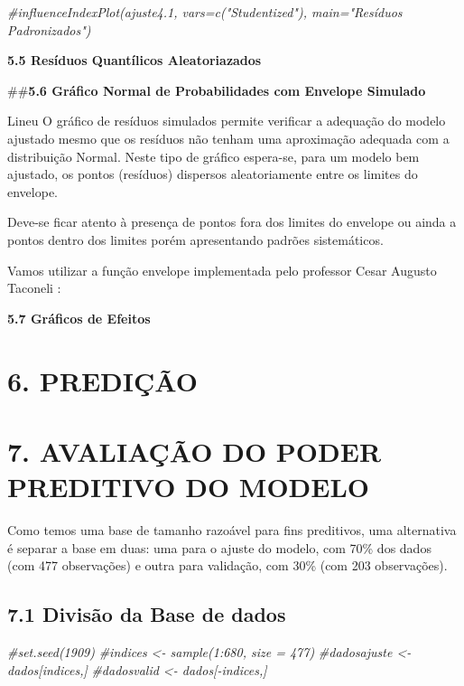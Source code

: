\documentclass[]{article}
\newenvironment{Shaded}{\begin{snugshade}}{\end{snugshade}}
\newcommand{\CommentTok}[1]{\textcolor[rgb]{0.56,0.35,0.01}{\textit{#1}}}
\begin{document}
\begin{Shaded}
\begin{Highlighting}[]
\CommentTok{#influenceIndexPlot(ajuste4.1, vars=c("Studentized"), main="Resíduos Padronizados")}
\end{Highlighting}
\end{Shaded}

\textbf{5.5 Resíduos Quantílicos Aleatoriazados}

\#\#\textbf{5.6 Gráfico Normal de Probabilidades com Envelope Simulado}

Lineu O gráfico de resíduos simulados permite verificar a adequação do
modelo ajustado mesmo que os resíduos não tenham uma aproximação
adequada com a distribuição Normal. Neste tipo de gráfico espera-se,
para um modelo bem ajustado, os pontos (resíduos) dispersos
aleatoriamente entre os limites do envelope.

Deve-se ficar atento à presença de pontos fora dos limites do envelope
ou ainda a pontos dentro dos limites porém apresentando padrões
sistemáticos.

Vamos utilizar a função envelope implementada pelo professor Cesar
Augusto Taconeli :

\textbf{5.7 Gráficos de Efeitos}

\hypertarget{predicao}{%
\section{6. PREDIÇÃO}\label{predicao}}

\hypertarget{avaliacao-do-poder-preditivo-do-modelo}{%
\section{7. AVALIAÇÃO DO PODER PREDITIVO DO
MODELO}\label{avaliacao-do-poder-preditivo-do-modelo}}

Como temos uma base de tamanho razoável para fins preditivos, uma
alternativa é separar a base em duas: uma para o ajuste do modelo, com
70\% dos dados (com 477 observações) e outra para validação, com 30\%
(com 203 observações).

\hypertarget{divisao-da-base-de-dados}{%
\subsection{\texorpdfstring{\textbf{7.1 Divisão da Base de
dados}}{7.1 Divisão da Base de dados}}\label{divisao-da-base-de-dados}}

\begin{Shaded}
\begin{Highlighting}[]
\CommentTok{#set.seed(1909)}
\CommentTok{#indices <- sample(1:680, size = 477) }
\CommentTok{#dadosajuste <- dados[indices,]}
\CommentTok{#dadosvalid <- dados[-indices,]}
\end{Highlighting}
\end{Shaded}
\end{document}
